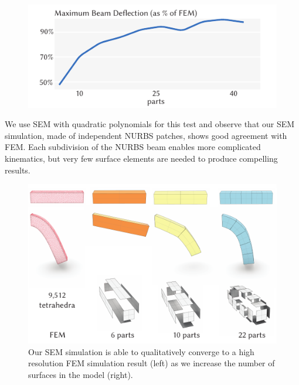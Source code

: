 \begin{figure}[h]
  \includegraphics[width=\columnwidth]{figures/deflection_full.pdf}
	\caption{}
  \label{fig:plot_beam_deflection}
\end{figure}

We use SEM with quadratic polynomials for this test and observe that our SEM simulation, made of  independent NURBS patches, shows good agreement with FEM. Each subdivision of the NURBS beam enables more complicated kinematics, 
but very few surface elements are needed to produce compelling results.


\begin{figure}[h]
  \includegraphics[width=\columnwidth]{figures/beams.pdf}
  \caption{Our SEM simulation is able to qualitatively converge to a high resolution FEM simulation result (left) as we increase the number of surfaces in the model (right). }
  \label{fig:convergence}
\end{figure}

